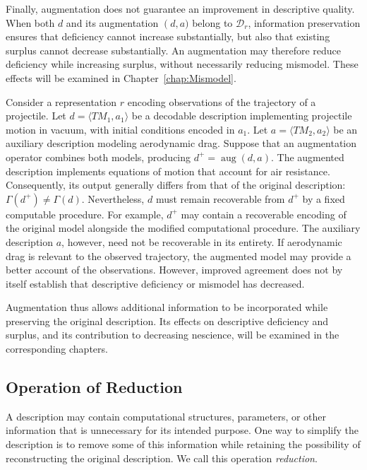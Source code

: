 Finally, augmentation does not guarantee an improvement in descriptive quality. When both $d$ and its augmentation $\operatorname(d,a)$ belong to $\mathcal D_r$, information preservation ensures that deficiency cannot increase substantially, but also that existing surplus cannot decrease substantially. An augmentation may therefore reduce deficiency while increasing surplus, without necessarily reducing mismodel. These effects will be examined in Chapter~\ref{chap:Mismodel}.

\begin{example}
Consider a representation $r$ encoding observations of the trajectory of a projectile. Let $d=\langle TM_1,a_1\rangle$ be a decodable description implementing projectile motion in vacuum, with initial conditions encoded in $a_1$. Let $a=\langle TM_2,a_2\rangle$ be an auxiliary description modeling aerodynamic drag.
Suppose that an augmentation operator combines both models, producing $d^+=\operatorname{aug}(d,a)$. The augmented description implements equations of motion that account for air resistance. Consequently, its output generally differs from that of the original description: $\Gamma(d^+)\neq\Gamma(d)$. Nevertheless, $d$ must remain recoverable from $d^+$ by a fixed computable procedure. For example, $d^+$ may contain a recoverable encoding of the original model alongside the modified computational procedure. The auxiliary description $a$, however, need not be recoverable in its entirety. If aerodynamic drag is relevant to the observed trajectory, the augmented model may provide a better account of the observations. However, improved agreement does not by itself establish that descriptive deficiency or mismodel has decreased.
\end{example}

Augmentation thus allows additional information to be incorporated while preserving the original description. Its effects on descriptive deficiency and surplus, and its contribution to decreasing nescience, will be examined in the corresponding chapters.


\subsection*{Operation of Reduction}

A description may contain computational structures, parameters, or other information that is unnecessary for its intended purpose. One way to simplify the description is to remove some of this information while retaining the possibility of reconstructing the original description. We call this operation \emph{reduction}.

